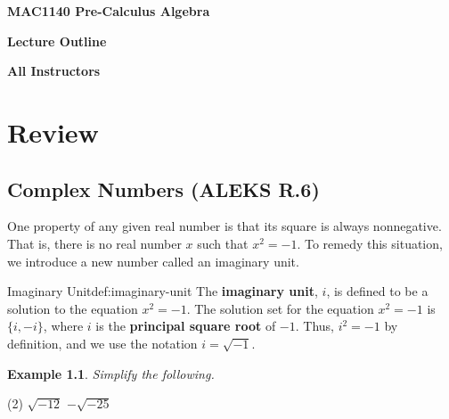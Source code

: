 \documentclass[a4paper, 12pt]{amsbook}
\newcounter{examplecounter}
\newtheorem{example}[examplecounter]{Example}
\begin{document}
\vspace*{3.0cm}
\begin{center}
    {\Huge \selectfont \textbf{MAC1140 Pre-Calculus Algebra}}
\end{center}

\vspace*{1.0cm}
\begin{center}
	{\Huge \selectfont \textbf{Lecture Outline}}
\end{center}

\vspace*{1.0cm}
\begin{center}
	{\Huge \selectfont \textbf{All Instructors}}
\end{center}
\tableofcontents
\clearpage



\setcounter{chapter}{-1}
\pagestyle{fancy}

\newpage


\chapter{Review}
\section{Complex Numbers (ALEKS R.6)}

One property of any given real number is that its square is always nonnegative. That is, there is no real number $x$ such that $x^2 = -1$. To remedy this situation, we introduce a new number called an imaginary unit.

\begin{ColoredDefinition}{Imaginary Unit}{def:imaginary-unit}
The {\bf imaginary unit}, $i$, is defined to be a solution to the equation $x^2 = -1$. The solution set for the equation $x^2=-1$ is $\{i,-i\}$, where $i$ is the {\bf principal square root} of $-1$.
Thus, $i^2=-1$ by definition, and we use the notation $i = \sqrt{-1}$.
\end{ColoredDefinition}


\begin{example}
	Simplify the following.
\end{example}

\begin{tasks}(2)
	\task \quad $\sqrt{-12}$
	\task \quad $-\sqrt{-25}$
\end{tasks}
\vfill
\end{document}
